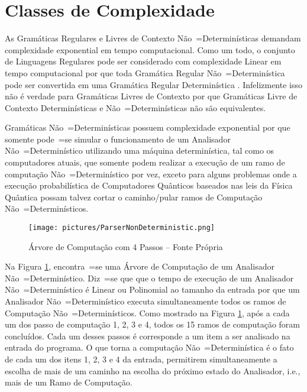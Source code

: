 {\section{Classes de Complexidade}
\label{classesDeComplexidade}

    As Gramáticas Regulares e
    Livres de Contexto Não~=Determinísticas demandam
    complexidade exponential em tempo computacional.
    Como um todo,
    o conjunto de Linguagens Regulares pode ser considerado com complexidade Linear em
    tempo computacional por que toda Gramática Regular Não~=Determinística pode ser
    convertida em uma Gramática Regular Determinística \cite{sipserBook}.
    Infelizmente isso não é verdade para Gramáticas Livres de Contexto
    por que Gramáticas Livre de Contexto Determinísticas e
    Não~=Determinísticas não são equivalentes.

    Gramáticas Não~=Determinísticas possuem complexidade exponential por
    que somente pode~=se simular o funcionamento de um Analisador
    Não~=Determinístico utilizando uma máquina determinística,
    tal como os computadores atuais,
    que somente podem realizar a execução de um ramo de computação Não~=Determinístico por vez,
    exceto para alguns problemas onde a execução probabilística de Computadores
    Quânticos \cite{nonlinearQuantumComputers} baseados nas leis da Física
    Quântica \cite{dicke1963QuantumPhysicsIntroduction} possam talvez cortar
    o caminho\slash{}pular ramos de Computação Não~=Determinísticos.
    \begin{figure}[H]
    \centering
    \texttt{[image: pictures/ParserNonDeterministic.png]}
    \caption{Árvore de Computação com 4 Passos -- Fonte Própria}
    \label{fig:pictures/ParserNonDeterministic.png}
    \end{figure}

    Na Figura \ref{fig:pictures/ParserNonDeterministic.png},
    encontra~=se uma Árvore de Computação de um Analisador Não~=Determinístico.
    Diz~=se que que o tempo de execução de um Analisador Não~=Determinístico é Linear
    ou Polinomial ao tamanho da entrada por que um Analisador Não~=Determinístico
    executa simultaneamente todos os ramos de Computação Não~=Determinísticos.
    Como mostrado na Figura \ref{fig:pictures/ParserNonDeterministic.png},
    após a cada um dos passo de computação 1,
    2, 3 e 4,
    todos os 15 ramos de computação foram concluídos.
    Cada um desses passos é corresponde a um item a ser analisado na entrada do programa.
    O que torna a computação Não~=Determinística é o fato de cada um dos itens 1,
    2, 3 e 4 da entrada,
    permitirem simultaneamente a escolha de mais de um
    caminho na escolha do próximo estado do Analisador,
    i.e.,
    mais de um Ramo de Computação.

}
